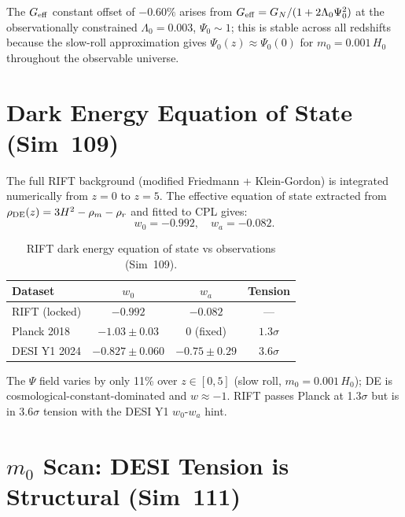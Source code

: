 \documentclass[12pt,a4paper]{article}
\begin{document}
The $G_{\rm eff}$ constant offset of $-0.60\%$ arises from
$G_{\rm eff}=G_N/(1+2\Lambda_0\Psi_0^2)$ at the observationally constrained
$\Lambda_0=0.003$, $\Psi_0\sim1$; this is stable across all redshifts because
the slow-roll approximation gives $\Psi_0(z)\approx\Psi_0(0)$ for
$m_0=0.001\,H_0$ throughout the observable universe.

\section{Dark Energy Equation of State (Sim~109)}
\label{sec:sim109}

The full RIFT background (modified Friedmann + Klein-Gordon) is integrated
numerically from $z=0$ to $z=5$.  The effective equation of state extracted
from $\rho_{\rm DE}(z)=3H^2-\rho_m-\rho_r$ and fitted to CPL gives:
\[
  w_0 = -0.992,\quad w_a = -0.082 .
\]

\begin{table}[h]
\centering
\caption{RIFT dark energy equation of state vs observations (Sim~109).}
\begin{tabular}{lccc}
\hline
Dataset & $w_0$ & $w_a$ & Tension \\
\hline
RIFT (locked) & $-0.992$ & $-0.082$ & --- \\
Planck 2018   & $-1.03\pm0.03$ & $0$ (fixed) & $1.3\sigma$ \\
DESI Y1 2024  & $-0.827\pm0.060$ & $-0.75\pm0.29$ & $3.6\sigma$ \\
\hline
\end{tabular}
\end{table}

The $\Psi$ field varies by only 11\% over $z\in[0,5]$ (slow roll, $m_0=0.001\,H_0$);
DE is cosmological-constant-dominated and $w\approx-1$.  RIFT passes Planck
at 1.3$\sigma$ but is in 3.6$\sigma$ tension with the DESI Y1 $w_0$-$w_a$ hint.

\section{$m_0$ Scan: DESI Tension is Structural (Sim~111)}
\label{sec:sim111}
\end{document}
